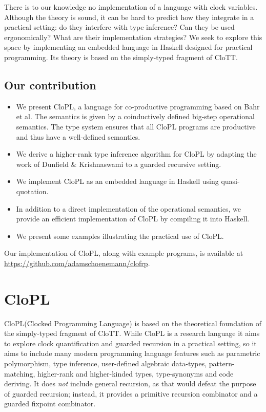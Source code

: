 \documentclass[sigplan,9pt,review]{acmart}\settopmatter{printfolios=true,printccs=false,printacmref=false}
\newcommand{\clott}{\textsf{CloTT}\xspace}
\newcommand{\clopl}{\textsf{CloPL}\xspace}
\begin{document}
There is to our knowledge no implementation of a language with clock variables. Although
the theory is sound, it can be hard to predict how they integrate in a practical setting:
do they interfere with type inference? Can they be used ergonomically? What are their
implementation strategies? We seek to explore this space by implementing an
embedded language in Haskell designed for practical programming. Its theory is based on the
simply-typed fragment of \clott.

\subsection{Our contribution}
\begin{itemize}
  \item We present \clopl, a language for co-productive programming
        based on Bahr et al\cite{bahrclocks}. The semantics is given by a coinductively defined
        big-step operational semantics. The type system
        ensures that all CloPL programs are productive and thus have a well-defined
        semantics.
  \item We derive a higher-rank type inference algorithm for \clopl by adapting the work of
        Dunfield \& Krishnaswami \cite{dunfield2013complete} to a guarded recursive setting.
  \item We implement \clopl as an embedded language in Haskell using quasi-quotation.
  \item In addition to a direct implementation of the operational semantics,
        we provide an efficient implementation of \clopl by compiling it into
        Haskell.
  \item We present some examples illustrating the practical use of \clopl.
\end{itemize}

Our implementation of \clopl, along with example programs, is available
at \url{https://github.com/adamschoenemann/clofrp}.

\section{\clopl}\label{sec:clopl}
\clopl (Clocked Programming Language) is based on the theoretical foundation
of the simply-typed fragment of \clott. While \clopl is a research language it aims to explore
clock quantification and guarded recursion in a practical setting, so it aims to include many
modern programming language features such as parametric polymorphism, type inference,
user-defined algebraic data-types, pattern-matching, higher-rank and higher-kinded types,
type-synonyms and code deriving.
It does \textit{not} include general recursion, as that would defeat the purpose of
guarded recursion; instead, it provides a primitive recursion combinator and a guarded
fixpoint combinator.
\end{document}
